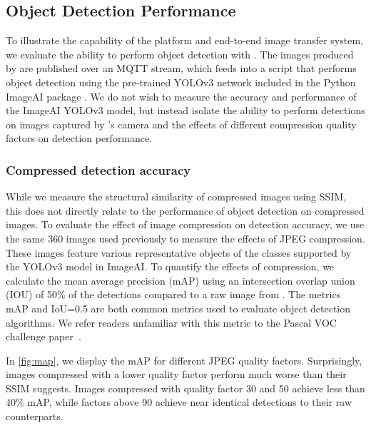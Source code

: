 
\subsection{Object Detection Performance}
To illustrate the capability of the platform and end-to-end image transfer system, we evaluate the ability to perform object detection with \name. The images produced by \name are published over an MQTT stream, which feeds into a script that performs object detection using the pre-trained YOLOv3 network included in the Python ImageAI package \cite{ImageAI}. We do not wish to measure the accuracy and performance of the ImageAI YOLOv3 model, but instead isolate the ability to perform detections on images captured by \name's camera and the effects of different compression quality factors on detection performance.


\subsubsection{Compressed detection accuracy}
While we measure the structural similarity of compressed images using SSIM, this does not directly relate to the performance of object detection on compressed images. To evaluate the effect of image compression on detection accuracy, we use the same 360 images used previously to measure the effects of JPEG compression. These images feature various representative objects of the classes supported by the YOLOv3 model in ImageAI. To quantify the effects of compression, we calculate the mean average precision (mAP) using an intersection overlap union (IOU) of 50\% of the detections compared to a raw image from \name. 
The metrics mAP and IoU=0.5 are both common metrics used to evaluate object detection algorithms. We refer readers unfamiliar with this metric to the Pascal VOC challenge paper~\cite{everingham2010pascal}.

In \cref{fig:map}, we display the mAP for different JPEG quality factors. Surprisingly, images compressed with a lower quality factor perform much worse than their SSIM suggests. Images compressed with quality factor 30 and 50 achieve less than 40\% mAP, while factors above 90 achieve near identical detections to their raw counterparts.

